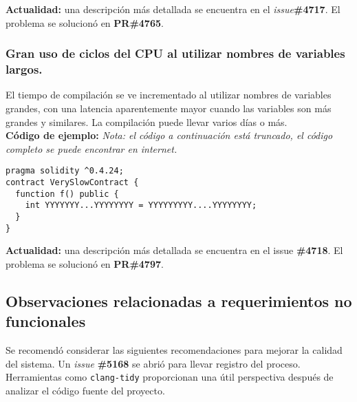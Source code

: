 \textbf{Actualidad:} una descripción más detallada se encuentra en el \textit{issue}\textbf{\#4717}\cite{GHI4717}. El problema se solucionó en \textbf{PR\#4765}\cite{GHPR4765}.\\

\subsubsection{Gran uso de ciclos del CPU al utilizar nombres de variables largos.}

El tiempo de compilación se ve incrementado al utilizar nombres de variables grandes, con una latencia aparentemente mayor cuando las variables son más grandes y similares. La compilación puede llevar varios días o más.\\

\textbf{Código de ejemplo:}
\textit{Nota: el código a continuación está truncado, el código completo se puede encontrar en internet\cite{GistMattaerealTruncated}.}
\begin{lstlisting}[language=Solidity]
pragma solidity ^0.4.24;
contract VerySlowContract {
  function f() public {
    int YYYYYYY...YYYYYYYY = YYYYYYYYY....YYYYYYYY;      
  }
}
\end{lstlisting}

\textbf{Actualidad:} una descripción más detallada se encuentra en el issue \textbf{\#4718}\cite{GHI4718}. El problema se solucionó en \textbf{PR\#4797}\cite{GHPR4797}.\\

\subsection{Observaciones relacionadas a requerimientos no funcionales}

Se recomendó considerar las siguientes recomendaciones para mejorar la calidad del sistema. Un \textit{issue} \textbf{\#5168}\cite{GHI5168} se abrió para llevar registro del proceso. Herramientas como \texttt{clang-tidy} proporcionan una útil perspectiva después de analizar el código fuente del proyecto.\\

